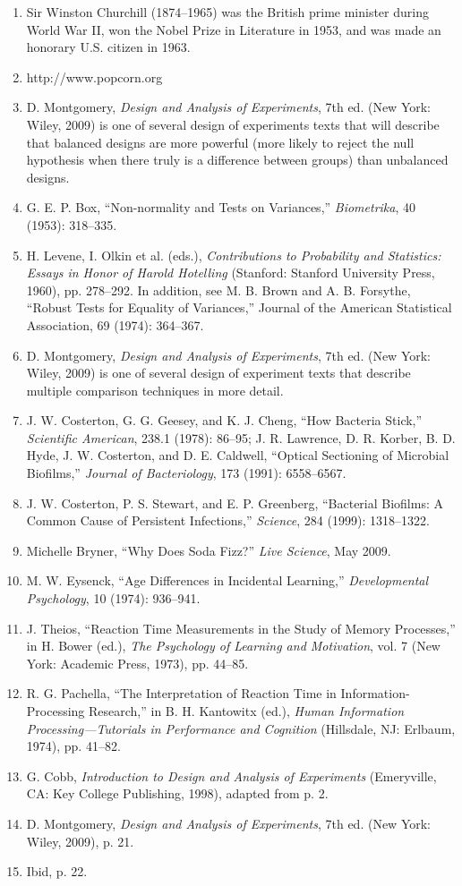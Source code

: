 \documentclass[
]{report}
\begin{document}
\begin{enumerate}

\item Sir Winston Churchill (1874–1965) was the British prime minister during World War II, won the Nobel Prize in
Literature in 1953, and was made an honorary U.S. citizen in 1963.
\item http://www.popcorn.org
\item D. Montgomery, \textit{Design and Analysis of Experiments}, 7th ed. (New York: Wiley, 2009) is one of several design of
experiments texts that will describe that balanced designs are more powerful (more likely to reject the null hypothesis
when there truly is a difference between groups) than unbalanced designs.
\item G. E. P. Box, “Non-normality and Tests on Variances,” \textit{Biometrika}, 40 (1953): 318–335.
\item H. Levene, I. Olkin et al. (eds.), \textit{Contributions to Probability and Statistics: Essays in Honor of Harold Hotelling}
(Stanford: Stanford University Press, 1960), pp. 278–292. In addition, see M. B. Brown and A. B. Forsythe, “Robust
Tests for Equality of Variances,” Journal of the American Statistical Association, 69 (1974): 364–367.
\item D. Montgomery, \textit{Design and Analysis of Experiments}, 7th ed. (New York: Wiley, 2009) is one of several design of
experiment texts that describe multiple comparison techniques in more detail.
\item J. W. Costerton, G. G. Geesey, and K. J. Cheng, “How Bacteria Stick,” \textit{Scientific American}, 238.1 (1978): 86–95;
J. R. Lawrence, D. R. Korber, B. D. Hyde, J. W. Costerton, and D. E. Caldwell, “Optical Sectioning of Microbial
Biofilms,” \textit{Journal of Bacteriology}, 173 (1991): 6558–6567.
\item J. W. Costerton, P. S. Stewart, and E. P. Greenberg, “Bacterial Biofilms: A Common Cause of Persistent Infections,”
\textit{Science}, 284 (1999): 1318–1322.
\item Michelle Bryner, “Why Does Soda Fizz?” \textit{Live Science}, May 2009.
\item M. W. Eysenck, “Age Differences in Incidental Learning,” \textit{Developmental Psychology}, 10 (1974): 936–941.
\item J. Theios, “Reaction Time Measurements in the Study of Memory Processes,” in H. Bower (ed.), \textit{The Psychology of
Learning and Motivation}, vol. 7 (New York: Academic Press, 1973), pp. 44–85.
\item R. G. Pachella, “The Interpretation of Reaction Time in Information-Processing Research,” in B. H. Kantowitx (ed.),
\textit{Human Information Processing—Tutorials in Performance and Cognition} (Hillsdale, NJ: Erlbaum, 1974), pp. 41–82.
\item G. Cobb, \textit{Introduction to Design and Analysis of Experiments} (Emeryville, CA: Key College Publishing, 1998),
adapted from p. 2.
\item D. Montgomery, \textit{Design and Analysis of Experiments}, 7th ed. (New York: Wiley, 2009), p. 21.
\item Ibid, p. 22.

\end{enumerate}
\end{document}
